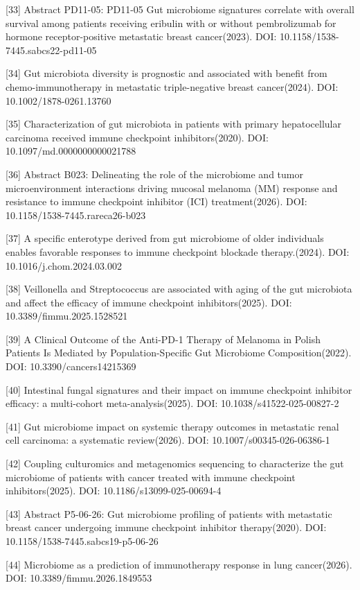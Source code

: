 {[}33{]} Abstract PD11-05: PD11-05 Gut microbiome signatures correlate with overall survival among patients receiving eribulin with or without pembrolizumab for hormone receptor-positive metastatic breast cancer(2023). DOI: 10.1158/1538-7445.sabcs22-pd11-05

{[}34{]} Gut microbiota diversity is prognostic and associated with benefit from chemo-immunotherapy in metastatic triple-negative breast cancer(2024). DOI: 10.1002/1878-0261.13760

{[}35{]} Characterization of gut microbiota in patients with primary hepatocellular carcinoma received immune checkpoint inhibitors(2020). DOI: 10.1097/md.0000000000021788

{[}36{]} Abstract B023: Delineating the role of the microbiome and tumor microenvironment interactions driving mucosal melanoma (MM) response and resistance to immune checkpoint inhibitor (ICI) treatment(2026). DOI: 10.1158/1538-7445.rareca26-b023

{[}37{]} A specific enterotype derived from gut microbiome of older individuals enables favorable responses to immune checkpoint blockade therapy.(2024). DOI: 10.1016/j.chom.2024.03.002

{[}38{]} Veillonella and Streptococcus are associated with aging of the gut microbiota and affect the efficacy of immune checkpoint inhibitors(2025). DOI: 10.3389/fimmu.2025.1528521

{[}39{]} A Clinical Outcome of the Anti-PD-1 Therapy of Melanoma in Polish Patients Is Mediated by Population-Specific Gut Microbiome Composition(2022). DOI: 10.3390/cancers14215369

{[}40{]} Intestinal fungal signatures and their impact on immune checkpoint inhibitor efficacy: a multi-cohort meta-analysis(2025). DOI: 10.1038/s41522-025-00827-2

{[}41{]} Gut microbiome impact on systemic therapy outcomes in metastatic renal cell carcinoma: a systematic review(2026). DOI: 10.1007/s00345-026-06386-1

{[}42{]} Coupling culturomics and metagenomics sequencing to characterize the gut microbiome of patients with cancer treated with immune checkpoint inhibitors(2025). DOI: 10.1186/s13099-025-00694-4

{[}43{]} Abstract P5-06-26: Gut microbiome profiling of patients with metastatic breast cancer undergoing immune checkpoint inhibitor therapy(2020). DOI: 10.1158/1538-7445.sabcs19-p5-06-26

{[}44{]} Microbiome as a prediction of immunotherapy response in lung cancer(2026). DOI: 10.3389/fimmu.2026.1849553

